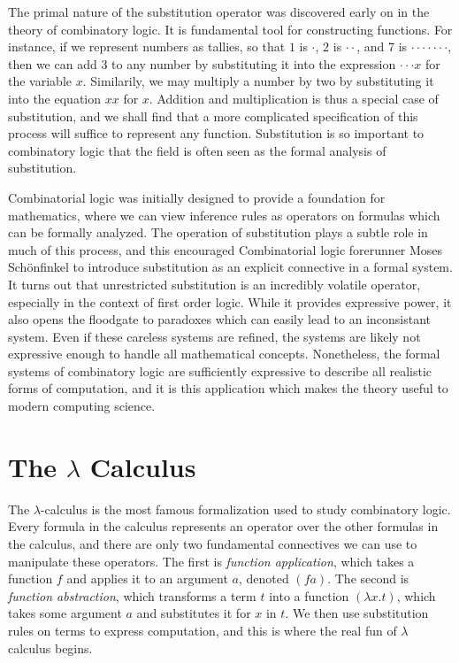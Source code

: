 The primal nature of the substitution operator was discovered early on in the theory of combinatory logic. It is fundamental tool for constructing functions. For instance, if we represent numbers as tallies, so that $1$ is $\cdot$, $2$ is $\cdot \cdot$, and 7 is $\cdot \cdot \cdot \cdot \cdot \cdot \cdot$, then we can add 3 to any number by substituting it into the expression $\cdot \cdot \cdot x$ for the variable $x$. Similarily, we may multiply a number by two by substituting it into the equation $xx$ for $x$. Addition and multiplication is thus a special case of substitution, and we shall find that a more complicated specification of this process will suffice to represent any function. Substitution is so important to combinatory logic that the field is often seen as the formal analysis of substitution.

Combinatorial logic was initially designed to provide a foundation for mathematics, where we can view inference rules as operators on formulas which can be formally analyzed. The operation of substitution plays a subtle role in much of this process, and this encouraged Combinatorial logic forerunner Moses Sch\"{o}nfinkel to introduce substitution as an explicit connective in a formal system. It turns out that unrestricted substitution is an incredibly volatile operator, especially in the context of first order logic. While it provides expressive power, it also opens the floodgate to paradoxes which can easily lead to an inconsistant system. Even if these careless systems are refined, the systems are likely not expressive enough to handle all mathematical concepts. Nonetheless, the formal systems of combinatory logic are sufficiently expressive to describe all realistic forms of computation, and it is this application which makes the theory useful to modern computing science.

\section{The $\lambda$ Calculus}

The $\lambda$-calculus is the most famous formalization used to study combinatory logic. Every formula in the calculus represents an operator over the other formulas in the calculus, and there are only two fundamental connectives we can use to manipulate these operators. The first is \emph{function application}, which takes a function $f$ and applies it to an argument $a$, denoted $(f a)$. The second is \emph{function abstraction}, which transforms a term $t$ into a function $(\lambda x.t)$, which takes some argument $a$ and substitutes it for $x$ in $t$. We then use substitution rules on terms to express computation, and this is where the real fun of $\lambda$ calculus begins.

